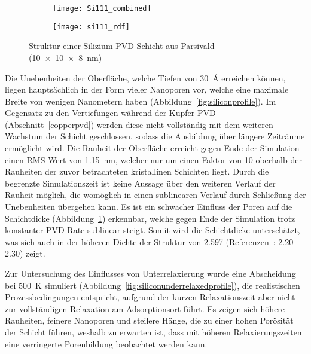 \begin{figure}[t]
  \captionsetup[subfigure]{singlelinecheck=false}
  \def\subfigwidth{0.48\textwidth}
  \begin{subfigure}[t]{\subfigwidth}
    \texttt{[image: Si111\_combined]}
    \label{fig:siliconresults-a}
  \end{subfigure}
  \hfill
  \begin{subfigure}[t]{\subfigwidth}
    \texttt{[image: si111\_rdf]}
    \label{fig:siliconresults-b}
  \end{subfigure}
  \caption[Dicke, Rauheit und RDF einer -Schicht aus Parsivald]{
    Struktur einer Silizium-PVD-Schicht aus Parsivald (\SI{10x10x8}{\nano\meter})
  }
  \label{fig:siliconresults}
\end{figure}

Die Unebenheiten der Oberfläche, welche Tiefen von \SI{30}{\angstrom} erreichen können, liegen hauptsächlich in der Form vieler Nanoporen vor, welche eine maximale Breite von wenigen Nanometern haben (Abbildung~\ref{fig:siliconprofile}).
Im Gegensatz zu den Vertiefungen während der Kupfer-PVD (Abschnitt~\ref{copperpvd}) werden diese nicht vollständig mit dem weiteren Wachstum der Schicht geschlossen, sodass die Ausbildung über längere Zeiträume ermöglicht wird.
Die Rauheit der Oberfläche erreicht gegen Ende der Simulation einen RMS-Wert von \SI{1.15}{\nano\meter}, welcher nur um einen Faktor von \num{10} oberhalb der Rauheiten der zuvor betrachteten kristallinen Schichten liegt.
Durch die begrenzte Simulationszeit ist keine Aussage über den weiteren Verlauf der Rauheit möglich, die womöglich in einen sublinearen Verlauf durch Schließung der Unebenheiten übergehen kann.
Es ist ein schwacher Einfluss der Poren auf die Schichtdicke (Abbildung~\ref{fig:siliconresults-a}) erkennbar, welche gegen Ende der Simulation trotz konstanter PVD-Rate sublinear steigt.
Somit wird die Schichtdicke unterschätzt, was sich auch in der höheren Dichte der Struktur von \SI{2.597}{\gpcc} (Referenzen~\cite{remes_optical_1998,renner_density_1973}: \SIrange{2.20}{2.30}{\gpcc}) zeigt.

Zur Untersuchung des Einflusses von Unterrelaxierung wurde eine Abscheidung bei \SI{500}{\kelvin} simuliert (Abbildung~\ref{fig:siliconunderrelaxedprofile}), die realistischen Prozessbedingungen entspricht, aufgrund der kurzen Relaxationszeit aber nicht zur vollständigen Relaxation am Adsorptionsort führt.
Es zeigen sich höhere Rauheiten, feinere Nanoporen und steilere Hänge, die zu einer hohen Porösität der Schicht führen, weshalb zu erwarten ist, dass mit höheren Relaxierungszeiten eine verringerte Porenbildung beobachtet werden kann.

